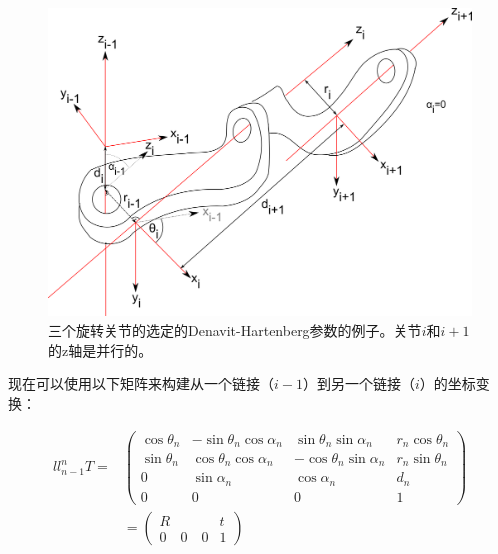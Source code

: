 \begin{figure}
	\centering
		\includegraphics[width=\textwidth]{figs/denavit-hartenberg}
	\caption {三个旋转关节的选定的Denavit-Hartenberg参数的例子。关节$i$和$i+1$的z轴是并行的。}
	\label{fig:denavit}
\end{figure}




现在可以使用以下矩阵来构建从一个链接（$i-1$）到另一个链接（$i$）的坐标变换：

\begin{eqnarray}{ll}
\nonumber
_{n-1}^nT=&
\left(
\begin{array}{ccc|c}
\cos \theta_n & -\sin \theta_n \cos\alpha_n & \sin\theta_n \sin\alpha_n & r_n \cos\theta_n\\
\sin \theta_n & \cos\theta_n \cos\alpha_n & -\cos\theta_n\sin\alpha_n & r_n \sin\theta_n\\
0 & \sin\alpha_n & \cos\alpha_n & d_n\\
\hline
0 & 0 & 0 & 1
\end{array}
\right)\\
&=
\left(
\begin{array}{c|c}
R & t\\
\hline
0 \quad 0 \quad 0 & 1
\end{array}
\right)
\end{eqnarray}


